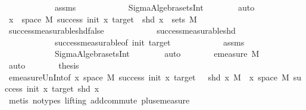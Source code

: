 \begin{isabellebody}
\ \ \ \ \ \ \ \ \ \ \ \ assms\isanewline
\ \ \ \ \ \ \ \ \ \ \ \ Sigma{\isacharunderscore}{\kern0pt}Algebra{\isachardot}{\kern0pt}sets{\isachardot}{\kern0pt}Int\isanewline
\ \ \ \ \ \ \isamarkupfalse%
\ auto\isanewline
\ \ \ \ \isamarkupfalse%
\ \isamarkupfalse%
\ {\isachardoublequoteopen}{\isacharbraceleft}{\kern0pt}x\ {\isasymin}\ space\ M{\isachardot}{\kern0pt}\ success\ init\ x\ target\ {\isasymand}\ shd\ x{\isacharbraceright}{\kern0pt}\ {\isasymin}\ sets\ M{\isachardoublequoteclose}\isanewline
\ \ \ \ \ \ \isamarkupfalse%
\ success{\isacharunderscore}{\kern0pt}measurable{\isacharunderscore}{\kern0pt}shd{\isacharunderscore}{\kern0pt}false\isanewline
\ \ \ \ \ \ \ \ \ \ \ \ success{\isacharunderscore}{\kern0pt}measurable{\isacharunderscore}{\kern0pt}shd\isanewline
\ \ \ \ \ \ \ \ \ \ \ \ success{\isacharunderscore}{\kern0pt}measurable{\isacharbrackleft}{\kern0pt}of\ init\ target{\isacharbrackright}{\kern0pt}\isanewline
\ \ \ \ \ \ \ \ \ \ \ \ assms\isanewline
\ \ \ \ \ \ \ \ \ \ \ \ Sigma{\isacharunderscore}{\kern0pt}Algebra{\isachardot}{\kern0pt}sets{\isachardot}{\kern0pt}Int\isanewline
\ \ \ \ \ \ \isamarkupfalse%
\ auto\isanewline
\ \ \ \ \isamarkupfalse%
\ \isamarkupfalse%
\ {\isachardoublequoteopen}emeasure\ M\ {\isacharbraceleft}{\kern0pt}{\isacharbraceright}{\kern0pt}\ {\isacharequal}{\kern0pt}\ {}{\isachardoublequoteclose}\isanewline
\ \ \ \ \ \ \isamarkupfalse%
\ auto\isanewline
\ \ \ \ \isamarkupfalse%
\ \isamarkupfalse%
\ {\isacharquery}{\kern0pt}thesis\isanewline
\ \ \ \ \ \ \isamarkupfalse%
\ emeasure{\isacharunderscore}{\kern0pt}Un{\isacharunderscore}{\kern0pt}Int{\isacharbrackleft}{\kern0pt}of\ {\isachardoublequoteopen}{\isacharbraceleft}{\kern0pt}x{\isasymin}\ space\ M{\isachardot}{\kern0pt}\ success\ init\ x\ target\ {\isasymand}\ {\isasymnot}\ {\isacharparenleft}{\kern0pt}shd\ x{\isacharparenright}{\kern0pt}{\isacharbraceright}{\kern0pt}{\isachardoublequoteclose}\ M\ \ {\isachardoublequoteopen}{\isacharbraceleft}{\kern0pt}x{\isasymin}\ space\ M{\isachardot}{\kern0pt}\ success\ init\ x\ target\ {\isasymand}{\isacharparenleft}{\kern0pt}shd\ x{\isacharparenright}{\kern0pt}{\isacharbraceright}{\kern0pt}{\isachardoublequoteclose}{\isacharbrackright}{\kern0pt}\isanewline
\ \ \ \ \ \ \isamarkupfalse%
\ {\isacharparenleft}{\kern0pt}metis\ {\isacharparenleft}{\kern0pt}no{\isacharunderscore}{\kern0pt}types{\isacharcomma}{\kern0pt}\ lifting{\isacharparenright}{\kern0pt}\ add{\isachardot}{\kern0pt}commute\ plus{\isacharunderscore}{\kern0pt}emeasure{\isacharparenright}{\kern0pt}\isanewline

\end{isabellebody}
